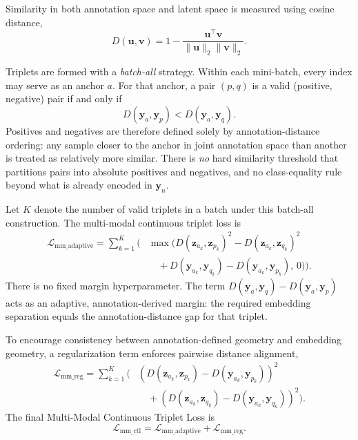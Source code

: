 \documentclass[10pt,twocolumn,letterpaper]{article}
\begin{document}
Similarity in both annotation space and latent space is measured using cosine
distance,
\begin{equation}
D(\mathbf{u},\mathbf{v})
=
1 -
\frac{
\mathbf{u}^{\top}\mathbf{v}
}{
\|\mathbf{u}\|_2 \|\mathbf{v}\|_2
}.
\end{equation}

Triplets are formed with a \emph{batch-all} strategy. Within each mini-batch, every index may serve as an anchor $a$. For that anchor, a pair $(p,q)$ is a valid (positive, negative) pair if and only if
\begin{equation}
\label{eq:triplet-order}
D(\mathbf{y}_a,\mathbf{y}_p)
<
D(\mathbf{y}_a,\mathbf{y}_q).
\end{equation}
Positives and negatives are therefore defined solely by annotation-distance ordering: any sample closer to the anchor in joint annotation space than another is treated as relatively more similar. There is \emph{no} hard similarity threshold that partitions pairs into absolute positives and negatives, and no class-equality rule beyond what is already encoded in $\mathbf{y}_n$.

Let $K$ denote the number of valid triplets in a batch under this batch-all construction. The multi-modal continuous triplet loss is
\begin{equation}
\label{eq:mm-adaptive}
\begin{aligned}
\mathcal{L}_{\text{mm\_adaptive}}
=
\sum_{k=1}^{K}
\Big(
& \max\!\big(
D(\mathbf{z}_{a_k},\mathbf{z}_{p_k})^2
-
D(\mathbf{z}_{a_k},\mathbf{z}_{q_k})^2 \\
& \quad +
D(\mathbf{y}_{a_k},\mathbf{y}_{q_k})
-
D(\mathbf{y}_{a_k},\mathbf{y}_{p_k}),
\, 0
\big)
\Big).
\end{aligned}
\end{equation}
There is no fixed margin hyperparameter. The term $D(\mathbf{y}_{a},\mathbf{y}_{q})-D(\mathbf{y}_{a},\mathbf{y}_{p})$ acts as an adaptive, annotation-derived margin: the required embedding separation equals the annotation-distance gap for that triplet.

To encourage consistency between annotation-defined geometry and embedding
geometry, a regularization term enforces pairwise distance alignment,
\begin{equation}
\label{eq:mm-reg}
\begin{aligned}
\mathcal{L}_{\text{mm\_reg}}
=
\sum_{k=1}^{K}
\Big(
& \left(
D(\mathbf{z}_{a_k},\mathbf{z}_{p_k})
-
D(\mathbf{y}_{a_k},\mathbf{y}_{p_k})
\right)^2 \\
& \quad +
\left(
D(\mathbf{z}_{a_k},\mathbf{z}_{q_k})
-
D(\mathbf{y}_{a_k},\mathbf{y}_{q_k})
\right)^2
\Big).
\end{aligned}
\end{equation}
The final Multi-Modal Continuous Triplet Loss is
\begin{equation}
\mathcal{L}_{\text{mm\_ctl}}
=
\mathcal{L}_{\text{mm\_adaptive}}
+
\mathcal{L}_{\text{mm\_reg}}.
\end{equation}
\end{document}

